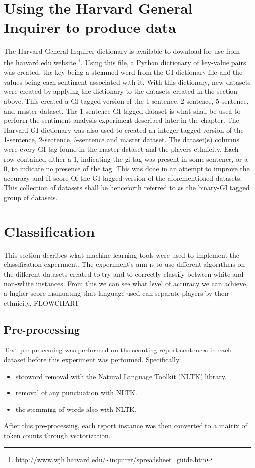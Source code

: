 \documentclass[oneside,12pt]{Classes/RoboticsLaTeX}
\begin{document}
\section{Using the Harvard General Inquirer to produce data}
\label{sec:GI_dict}
The Harvard General Inquirer dictionary is available to download for use from the harvard.edu website \footnote{\url{http://www.wjh.harvard.edu/~inquirer/spreadsheet_guide.htm}}. Using this file, a Python
dictionary of key-value pairs was created, the key being a stemmed word from the GI dictionary file and the values being each sentiment associated with it. With this dictionary, new datasets were created by 
applying the dictionary to the datasets created in the section above. This created a GI tagged version of the 1-sentence, 2-sentence, 5-sentence, and master dataset. The 1 sentence GI tagged 
dataset is what shall be used to perform the sentiment analysis experiment described later in the chapter.
The Harvard GI dictionary was also used to created an integer tagged version of the 1-sentence, 2-sentence, 5-sentence and master dataset. The dataset(s) columns were every GI tag found in the master dataset and 
the players ethnicity. Each row contained either a 1, indicating the gi tag was present in some sentence, or a 0, to indicate no presence of the tag. This was done in an attempt to improve the accuracy and f1-score Of
the GI tagged version of the aforementioned datasets. This collection of datasets shall be henceforth referred to as the binary-GI tagged group of datasets.

\section{Classification}
\label{sec:sci-kit_label}
This section decribes what machine learning tools were used to implement the classification experiment. The experiment's aim is to use different algorithms on the different datasets created to try and to
correctly classify between white and non-white instances. From this we can see what level of accuracy we can achieve, a higher score insinuating that language used can separate players by their ethnicity.
FLOWCHART
\subsection{Pre-processing}
Text pre-processing was performed on the scouting report sentences in each dataset before this experiment was performed.
Specifically:
\begin{itemize}
  \item stopword removal with the Natural Language Toolkit (NLTK) library.
  \item removal of any punctuation with NLTK.
  \item the stemming of words also with NLTK.
\end{itemize}
After this pre-processing, each report instance was then converted to a matrix of token counts through vectorization.
\end{document}

